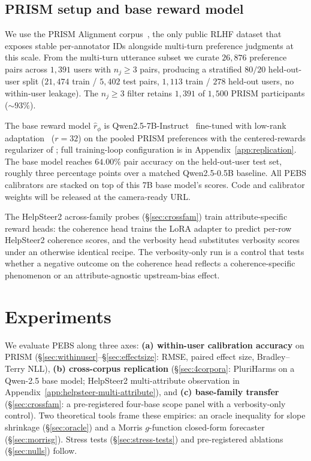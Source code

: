 \documentclass{article}
\begin{document}
\subsection{PRISM setup and base reward model}\label{sec:setup}
We use the PRISM Alignment corpus~\citep{kirk2024prism}, the only public
RLHF dataset that exposes stable per-annotator IDs alongside multi-turn
preference judgments at this scale. From the multi-turn utterance subset
we curate $26{,}876$ preference pairs across $1{,}391$ users with
$n_j{\ge}3$ pairs, producing a stratified $80/20$ held-out-user split
($21{,}474$ train / $5{,}402$ test pairs, $1{,}113$ train / $278$
held-out users, no within-user leakage).
The $n_j{\ge}3$ filter retains $1{,}391$ of $1{,}500$ PRISM
participants (${\sim}93\%$).

The base reward model $\hat r_\phi$ is Qwen2.5-7B-Instruct~\citep{qwen25}
fine-tuned with low-rank adaptation~\citep{hu2022lora} ($r{=}32$) on the
pooled PRISM preferences with the centered-rewards regularizer of
\citet{eisenstein2024helping}; full training-loop configuration is in
Appendix~\ref{app:replication}. The base model reaches $64.00\%$ pair
accuracy on the held-out-user test set, roughly three percentage points
over a matched Qwen2.5-0.5B baseline. All PEBS calibrators are stacked
on top of this 7B base model's scores. Code and calibrator weights will
be released at the camera-ready URL.

The HelpSteer2 across-family probes (\S\ref{sec:crossfam}) train
attribute-specific reward heads: the coherence head trains the LoRA
adapter to predict per-row HelpSteer2 coherence scores, and the
verbosity head substitutes verbosity scores under an otherwise
identical recipe. The verbosity-only run is a control that
tests whether a negative outcome on the coherence head reflects a
coherence-specific phenomenon or an attribute-agnostic upstream-bias
effect.

\section{Experiments}\label{sec:exp}

We evaluate PEBS along three axes:
\textbf{(a) within-user calibration accuracy} on PRISM
(\S\ref{sec:withinuser}--\S\ref{sec:effectsize}: RMSE, paired effect
size, Bradley--Terry NLL),
\textbf{(b) cross-corpus replication} (\S\ref{sec:4corpora}:
PluriHarms on a Qwen-2.5 base model; HelpSteer2 multi-attribute
observation in Appendix~\ref{app:helpsteer-multi-attribute}), and
\textbf{(c) base-family transfer} (\S\ref{sec:crossfam}: a
pre-registered four-base scope panel with a verbosity-only
control). Two theoretical tools frame these empirics: an
oracle inequality for slope shrinkage (\S\ref{sec:oracle}) and a
Morris $g$-function closed-form forecaster
(\S\ref{sec:morrisg}). Stress tests
(\S\ref{sec:stress-tests}) and pre-registered ablations
(\S\ref{sec:nulls}) follow.
\end{document}
